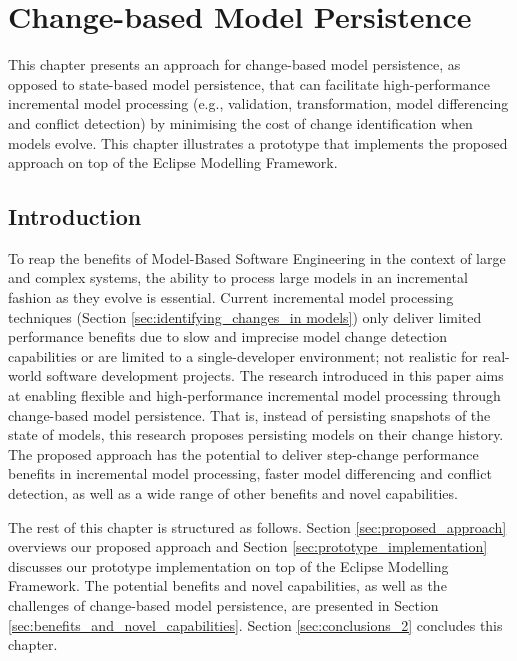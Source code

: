 \chapter{Change-based Model Persistence}
\label{ch:change_based_model_persistence}
This chapter presents an approach for change-based model 
persistence, as opposed to state-based model persistence,
that can facilitate high-performance incremental model processing 
(e.g., validation, transformation,
model differencing and conflict detection) by minimising the cost 
of change identification when models evolve. 
This chapter illustrates a prototype that implements the proposed
approach on top of the Eclipse Modelling Framework.

\section{Introduction}
\label{Introduction}
To reap the benefits of Model-Based Software Engineering in the context 
of large and complex systems, the ability to process large models 
in an incremental fashion as they evolve is essential. 
Current incremental model processing techniques 
(Section \ref{sec:identifying_changes_in models}) only deliver limited 
performance benefits due to slow and imprecise model change detection 
capabilities or are limited to a single-developer environment;
not realistic for real-world software development projects.
The research introduced in this paper aims at enabling flexible 
and high-performance incremental model processing through 
change-based model persistence. That is, instead of persisting snapshots 
of the state of models, this research proposes persisting models on their change history. The proposed approach has the potential to 
deliver step-change performance benefits in incremental model processing, 
faster model differencing and conflict detection, 
as well as a wide range of other benefits and novel capabilities.

The rest of this chapter is structured as follows. 
Section \ref{sec:proposed_approach} overviews our proposed approach 
and Section \ref{sec:prototype_implementation} discusses our prototype 
implementation on top of the Eclipse Modelling Framework. 
The potential benefits and novel capabilities, as well as the challenges 
of change-based model persistence, are presented in 
Section \ref{sec:benefits_and_novel_capabilities}. Section \ref{sec:conclusions_2} concludes this chapter.

